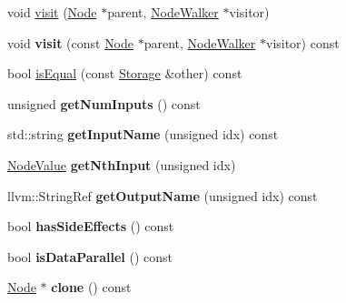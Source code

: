 \begin{DoxyCompactItemize}
\item 
void \hyperlink{classglow_1_1_storage_a1fe8d4de0e28ca6953f12b6c00c6f5bf}{visit} (\hyperlink{classglow_1_1_node}{Node} $\ast$parent, \hyperlink{classglow_1_1_node_walker}{Node\+Walker} $\ast$visitor)
\item 
\mbox{\label{classglow_1_1_storage_addc913b136cbeca89d09d7a3674fca51}} 
void {\bfseries visit} (const \hyperlink{classglow_1_1_node}{Node} $\ast$parent, \hyperlink{classglow_1_1_node_walker}{Node\+Walker} $\ast$visitor) const
\item 
bool \hyperlink{classglow_1_1_storage_a549ea8dc4f7cfe34182eda64649458d9}{is\+Equal} (const \hyperlink{classglow_1_1_storage}{Storage} \&other) const
\item 
\mbox{\label{classglow_1_1_storage_aa3023426f5be521dce556e921035a8ae}} 
unsigned {\bfseries get\+Num\+Inputs} () const
\item 
\mbox{\label{classglow_1_1_storage_a7db808c7ba539503399c6ef17810218a}} 
std\+::string {\bfseries get\+Input\+Name} (unsigned idx) const
\item 
\mbox{\label{classglow_1_1_storage_a33815a64d95165dee1b2af132759c8b2}} 
\hyperlink{structglow_1_1_node_value}{Node\+Value} {\bfseries get\+Nth\+Input} (unsigned idx)
\item 
\mbox{\label{classglow_1_1_storage_aafcae472e19c782758575ce6ac8fd51a}} 
llvm\+::\+String\+Ref {\bfseries get\+Output\+Name} (unsigned idx) const
\item 
\mbox{\label{classglow_1_1_storage_a2c0a996fceb11ca23557f4e18c4a3bbc}} 
bool {\bfseries has\+Side\+Effects} () const
\item 
\mbox{\label{classglow_1_1_storage_aceba5410b22c99a2694226cc1c983b26}} 
bool {\bfseries is\+Data\+Parallel} () const
\item 
\mbox{\label{classglow_1_1_storage_ae67868cab9873c1e770b8db8b5714491}} 
\hyperlink{classglow_1_1_node}{Node} $\ast$ {\bfseries clone} () const
\end{DoxyCompactItemize}

